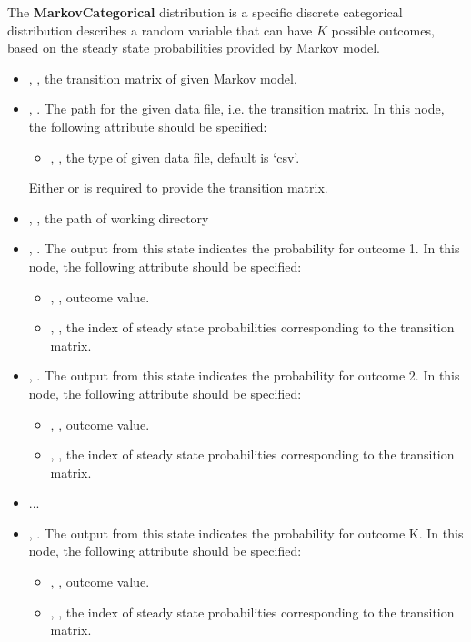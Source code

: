 The \textbf{MarkovCategorical} distribution is a specific discrete categorical distribution describes
a random variable that can have $K$ possible outcomes, based on the steady state probabilities provided by
Markov model.
%
\begin{itemize}
  \item {}, , the transition matrix of given Markov model.
  \item {}, . The path for the given data file, i.e. the transition matrix.
    In this node, the following attribute should be specified:
    \begin{itemize}
      \item {}, , the type of given data file, default is `csv'.
    \end{itemize}
  \nb Either  or  is required to provide the transition matrix.
  \item {}, , the path of working directory
  \item {}, . The output from this state indicates
    the probability for outcome 1.
    In this node, the following attribute should be specified:
    \begin{itemize}
      \item {}, , outcome value.
      \item {}, , the index of steady state probabilities corresponding to the transition matrix.
    \end{itemize}
  \item {}, . The output from this state indicates
    the probability for outcome 2.
    In this node, the following attribute should be specified:
    \begin{itemize}
      \item {}, , outcome value.
      \item {}, , the index of steady state probabilities corresponding to the transition matrix.
    \end{itemize}
  \item ...
  \item {}, . The output from this state indicates
    the probability for outcome K.
    In this node, the following attribute should be specified:
    \begin{itemize}
      \item {}, , outcome value.
      \item {}, , the index of steady state probabilities corresponding to the transition matrix.
    \end{itemize}

\end{itemize}

